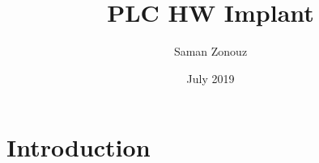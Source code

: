 \documentclass{article}
\title{PLC HW Implant}
\author{Saman Zonouz}
\date{July 2019}
\begin{document}
\maketitle

\section{Introduction}
\end{document}
